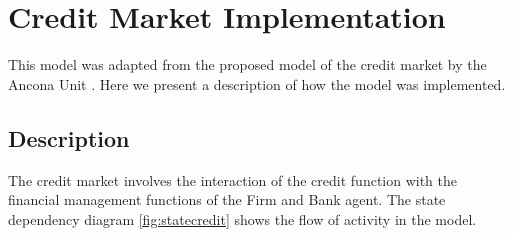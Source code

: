 \section{Credit Market Implementation}

This model was adapted from the proposed model of the credit market
by the Ancona Unit \cite{?}. Here we present a description of how
the model was implemented.

\subsection{Description}
The credit market involves the interaction of the credit function
with the financial management functions of the Firm and Bank agent.
The state dependency diagram \ref{fig:statecredit} shows the flow of
activity in the model.

%
%
%
%
%


